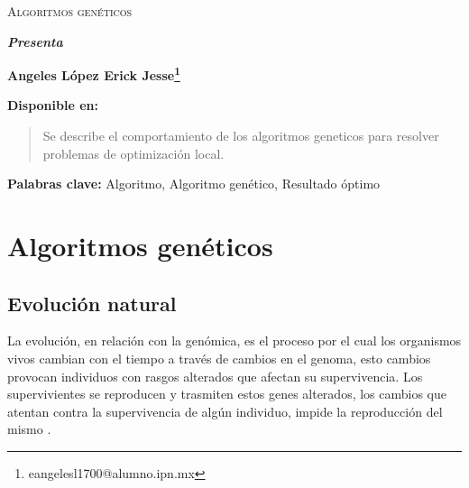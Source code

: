 \documentclass[12pt,twoside]{article}
\newcommand{\keywords}[1]{%
	\begin{center}
		\textbf{Palabras clave:} #1
	\end{center}
}
\begin{document}
	\centerline{}
	
	
	
	\begin{center}
		\Large{\textsc{Algoritmos genéticos}} 
	\end{center}
	\centerline{}
	\centerline{\bf {\textit{Presenta}}}
	\centerline{}
	\centerline{\bf {Angeles López Erick Jesse\footnote{eangelesl1700@alumno.ipn.mx}}}
	\centerline{}
	\centerline{}
	\centerline{\bf {Disponible en:}}
	\centerline{}
	
	
	
	\newtheorem{Theorem}{\quad Theorem}[section]
	
	\newtheorem{Definition}[Theorem]{\quad Definition}
	
	\newtheorem{Corollary}[Theorem]{\quad Corollary}
	
	\newtheorem{Lemma}[Theorem]{\quad Lemma}
	
	\newtheorem{Example}[Theorem]{\quad Example}
	
	\bigskip
	
	\bigskip
	
	\begin{abstract} 
		Se describe el comportamiento de los algoritmos geneticos para resolver problemas de optimización local.
	\end{abstract}
	
	\keywords{Algoritmo, Algoritmo genético, Resultado óptimo}
	
	\clearpage
	
	\tableofcontents
	\clearpage
	
	\section{Algoritmos genéticos}
	
	\subsection{Evolución natural}
	
	La evolución, en relación con la genómica, es el proceso por el cual los organismos vivos cambian con el tiempo a través de cambios en el genoma, esto cambios provocan individuos con rasgos alterados que afectan su supervivencia. Los supervivientes se reproducen y trasmiten estos genes alterados, los cambios que atentan contra la supervivencia de algún individuo, impide la reproducción del mismo \cite{evolucion}.
	
\end{document}
